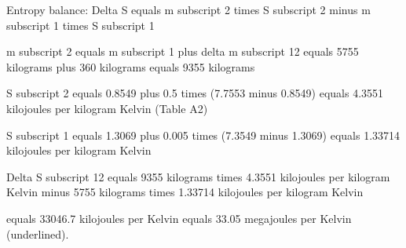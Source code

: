 Entropy balance:  
Delta S equals m subscript 2 times S subscript 2 minus m subscript 1 times S subscript 1  

m subscript 2 equals m subscript 1 plus delta m subscript 12 equals 5755 kilograms plus 360 kilograms equals 9355 kilograms  

S subscript 2 equals 0.8549 plus 0.5 times (7.7553 minus 0.8549) equals 4.3551 kilojoules per kilogram Kelvin  
(Table A2)  

S subscript 1 equals 1.3069 plus 0.005 times (7.3549 minus 1.3069) equals 1.33714 kilojoules per kilogram Kelvin  

Delta S subscript 12 equals 9355 kilograms times 4.3551 kilojoules per kilogram Kelvin minus 5755 kilograms times 1.33714 kilojoules per kilogram Kelvin  

equals 33046.7 kilojoules per Kelvin equals 33.05 megajoules per Kelvin (underlined).